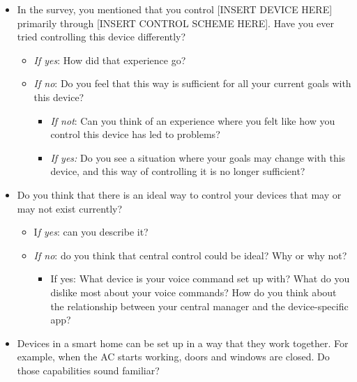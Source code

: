 \begin{itemize}
    \item In the survey, you mentioned that you control [INSERT DEVICE HERE] primarily through [INSERT CONTROL SCHEME HERE]. Have you ever tried controlling this device differently?
    \begin{itemize}
        \item \textit{If yes}: How did that experience go?
        \item \textit{If no}: Do you feel that this way is sufficient for all your current goals with this device? 
        \begin{itemize}
            \item \textit{If not}: Can you think of an experience where you felt like how you control this device has led to problems?
            \item \textit{If yes:} Do you see a situation where your goals may change with this device, and this way of controlling it is no longer sufficient?
        \end{itemize}
    \end{itemize}
\end{itemize}
\begin{itemize}
    \item Do you think that there is an ideal way to control your devices that may or may not exist currently?
    \begin{itemize}
        \item I\textit{f yes}: can you describe it?
        \item \textit{If no}: do you think that central control could be ideal? Why or why not?
        \begin{itemize}
            \item If yes: What device is your voice command set up with? What do you dislike most about your voice commands? How do you think about the relationship between your central manager and the device-specific app?
        \end{itemize}
    \end{itemize}
\end{itemize}
\begin{itemize}
    \item Devices in a smart home can be set up in a way that they work together. For example, when the AC starts working, doors and windows are closed. Do those capabilities sound familiar?
\end{itemize}
